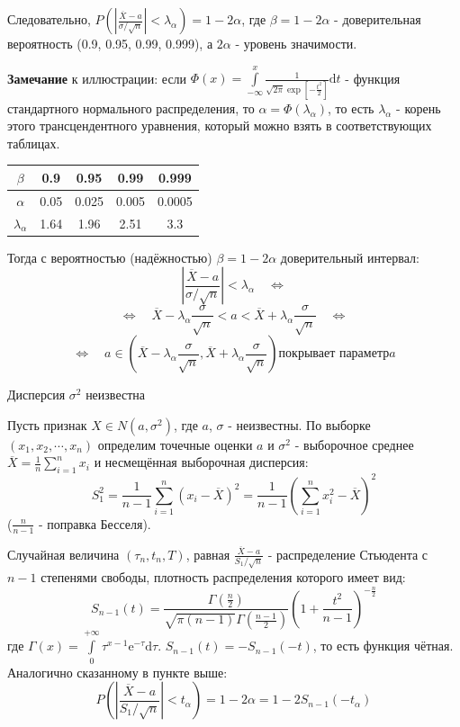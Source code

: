 \documentclass[12pt, a4paper]{article}
\newcommand{\di}{\mathrm{d}}
\begin{document}
Следовательно, $P(|\frac{\overline{X} - a}{\sigma / \sqrt{n}}| < \lambda_{\alpha}) = 1 - 2\alpha$, где $\beta = 1-2\alpha$ - доверительная вероятность (0.9, 0.95, 0.99, 0.999), а $2\alpha$ - уровень значимости.

\textbf{Замечание} к иллюстрации: если $\Phi (x) = \int \limits_{-\infty}^x \frac{1}{\sqrt{2\pi} \exp [-\frac{t^2}{2}]} \di t$ - функция стандартного нормального распределения, то $\alpha = \Phi(\lambda_{\alpha})$, то есть $\lambda_{\alpha}$ - корень этого трансцендентного уравнения, который можно взять в соответствующих таблицах.

\begin{center}
\begin{tabular}{|c|c|c|c|c|}
\hline
$\beta$ & 0.9 & 0.95 & 0.99 & 0.999 \\
\hline
$\alpha$ & 0.05 & 0.025 & 0.005 & 0.0005 \\
\hline
$\lambda_{\alpha}$ & 1.64 & 1.96 & 2.51 & 3.3 \\
\hline
\end{tabular}
\end{center}

Тогда с вероятностью (надёжностью) $\beta = 1-2\alpha$ доверительный интервал:
\[|\frac{\overline{X} - a}{\sigma / \sqrt{n}}| < \lambda_{\alpha} \quad \Leftrightarrow \]
\[\Leftrightarrow \quad \overline{X} - \lambda_{\alpha} \frac{\sigma}{\sqrt{n}} < a < \overline{X} + \lambda_{\alpha} \frac{\sigma}{\sqrt{n}} \quad \Leftrightarrow \]
\[\Leftrightarrow \quad a \in (\overline{X} - \lambda_{\alpha} \frac{\sigma}{\sqrt{n}}, \overline{X} + \lambda_{\alpha} \frac{\sigma}{\sqrt{n}}) \textrm{покрывает параметр} a \]

\begin{center}
\begin{Large}
Дисперсия $\sigma^2$ неизвестна
\end{Large}
\end{center}

Пусть признак $X \in N(a, \sigma^2)$, где $a$, $\sigma$ - неизвестны. По выборке $(x_1, x_2, \cdots, x_n)$ определим точечные оценки $a$ и $\sigma^2$ - выборочное среднее $\overline{X} = \frac{1}{n} \sum_{i=1}^n x_i$ и несмещённая выборочная дисперсия:
\[S_1^2 = \frac{1}{n-1} \sum_{i=1}^n (x_i - \overline{X})^2 = \frac{1}{n-1} (\sum_{i=1}^n x_i^2 - \overline{X})^2 \]
($\frac{n}{n-1}$ - поправка Бесселя). 

Случайная величина $(\tau_n, t_n, T)$, равная $\frac{\overline{X} - a}{S_1 / \sqrt{n}}$ - распределение Стьюдента с $n-1$ степенями свободы, плотность распределения которого имеет вид:
\[S_{n-1}(t) = \frac{\Gamma (\tfrac{n}{2})}{\sqrt{\pi (n-1)} \Gamma (\tfrac{n-1}{2})} (1+\frac{t^2}{n-1})^{-\tfrac{n}{2}} \]
где $\Gamma (x) = \int \limits_0^{+\infty} \tau^{x-1} \mathrm{e}^{-\tau} \di \tau$. $S_{n-1}(t) = -S_{n-1}(-t)$, то есть функция чётная. Аналогично сказанному в пункте выше:
\[P(|\frac{\overline{X} - a}{S_1 / \sqrt{n}}| < t_{\alpha}) = 1-2\alpha = 1-2S_{n-1}(-t_{\alpha}) \]
\end{document}
